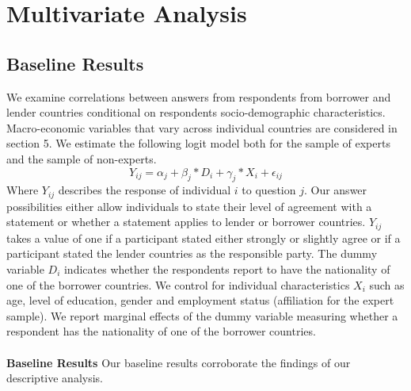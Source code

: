 \clearpage
\section{Multivariate Analysis}
\subsection{Baseline Results}
We examine correlations between answers from respondents from borrower and lender countries conditional on respondents socio-demographic characteristics. Macro-economic variables that vary across individual countries are considered in section 5. We estimate the following logit model both for the sample of experts and the sample of non-experts. 
\begin{equation*}
    Y_{ij}= \alpha_{j}+ \beta_{j} *D_{i} + \gamma_{j}*X_{i} + \epsilon_{ij}
\end{equation*}
Where $Y_{ij}$ describes the response of individual $i$ to question $j$. Our answer possibilities either allow individuals to state their level of agreement with a statement or whether a statement applies to lender or borrower countries. $Y_{ij}$ takes a value of one if a participant stated either strongly or slightly agree or if a participant stated the lender countries as the responsible party. The dummy variable $D_{i}$ indicates whether the respondents report to have the nationality of one of the borrower countries. We control for individual characteristics $X_{i}$ such as age, level of education, gender and employment status (affiliation for the expert sample). 
We report marginal effects of the dummy variable measuring whether a respondent has the nationality of one of the borrower countries.
\\ \\
\textbf{Baseline Results} 
Our baseline results corroborate the findings of our descriptive analysis. \\ 
